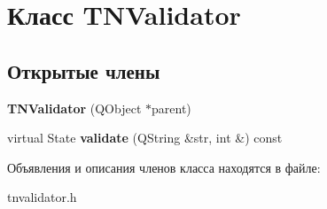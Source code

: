 \hypertarget{class_t_n_validator}{\section{Класс \-T\-N\-Validator}
\label{class_t_n_validator}
}
\subsection*{Открытые члены}
\begin{DoxyCompactItemize}
\item 
\hypertarget{class_t_n_validator_ac9e9209fc7c61dd3acee4f24a93c371b}{{\bfseries \-T\-N\-Validator} (\-Q\-Object $\ast$parent)}\label{class_t_n_validator_ac9e9209fc7c61dd3acee4f24a93c371b}

\item 
\hypertarget{class_t_n_validator_afb9e1c77ee1cb2b4a3d6e6454d3a9aff}{virtual \-State {\bfseries validate} (\-Q\-String \&str, int \&) const }\label{class_t_n_validator_afb9e1c77ee1cb2b4a3d6e6454d3a9aff}

\end{DoxyCompactItemize}


Объявления и описания членов класса находятся в файле\-:\begin{DoxyCompactItemize}
\item 
tnvalidator.\-h\end{DoxyCompactItemize}
